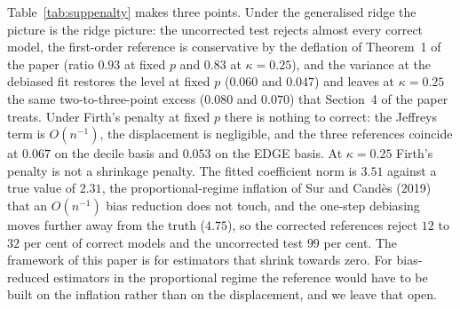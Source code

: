 \documentclass[namedate,webpdf,modern,mediumone]{oup-authoring-template}
\begin{document}
Table~\ref{tab:suppenalty} makes three points. Under the generalised ridge the picture is the ridge
picture: the uncorrected test rejects almost every correct model, the first-order reference is
conservative by the deflation of Theorem~1 of the paper (ratio $0.93$ at fixed $p$ and $0.83$ at
$\kappa = 0.25$), and the variance at the debiased fit restores the level at fixed $p$ ($0.060$ and
$0.047$) and leaves at $\kappa = 0.25$ the same two-to-three-point excess ($0.080$ and $0.070$)
that Section~4 of the paper treats. Under Firth's penalty at fixed $p$ there is nothing to correct:
the Jeffreys term is $O(n^{-1})$, the displacement is negligible, and the three references coincide
at $0.067$ on the decile basis and $0.053$ on the EDGE basis. At $\kappa = 0.25$ Firth's penalty is
not a shrinkage penalty. The fitted coefficient norm is $3.51$ against a true value of $2.31$, the
proportional-regime inflation of Sur and Cand\`es (2019) that an $O(n^{-1})$ bias reduction does not
touch, and the one-step debiasing moves further away from the truth ($4.75$), so the corrected
references reject $12$ to $32$ per cent of correct models and the uncorrected test $99$ per cent.
The framework of this paper is for estimators that shrink towards zero. For bias-reduced
estimators in the proportional regime the reference would have to be built on the inflation
rather than on the displacement, and we leave that open.
\end{document}
